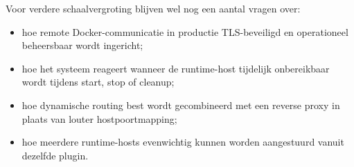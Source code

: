 Voor verdere schaalvergroting blijven wel nog een aantal vragen over:

\begin{itemize}
  \item hoe remote Docker-communicatie in productie TLS-beveiligd en operationeel beheersbaar wordt ingericht;
  \item hoe het systeem reageert wanneer de runtime-host tijdelijk onbereikbaar wordt tijdens start, stop of cleanup;
  \item hoe dynamische routing best wordt gecombineerd met een reverse proxy in plaats van louter hostpoortmapping;
  \item hoe meerdere runtime-hosts evenwichtig kunnen worden aangestuurd vanuit dezelfde plugin.
\end{itemize}
